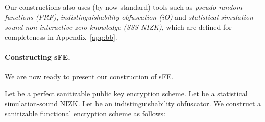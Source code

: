 \documentclass{llncs}
\begin{document}
Our constructions also uses (by now standard) tools such as \emph{pseudo-random functions (PRF)}, \emph{indistinguishability obfuscation (iO)} and \emph{statistical simulation-sound non-interactive zero-knowledge (SSS-NIZK)}, which are defined for completeness in Appendix~\ref{app:bb}.

\paragraph{Constructing sFE.} We are now ready to present our construction of sFE.

\begin{construction} \label{con:sanFE}
Let  be a perfect sanitizable public key encryption scheme.
Let  be a statistical simulation-sound NIZK.
Let  be an indistinguishability obfuscator.
We construct a sanitizable functional encryption scheme  as follows:
\end{construction}
\end{document}

